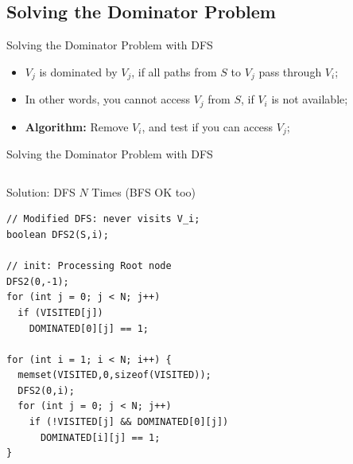 \subsection{Solving the Dominator Problem}

\begin{frame}[fragile]{Solving the Dominator Problem with DFS}
  \begin{exampleblock}{}
    \begin{itemize}
      \item $V_j$ is dominated by $V_j$, if all paths from $S$ to $V_j$ pass through $V_i$;
      \item In other words, you cannot access $V_j$ from $S$, if $V_i$ is not available;
      \item {\bf Algorithm:} Remove $V_i$, and test if you can access $V_j$;
    \end{itemize}
  \end{exampleblock}\bigskip

  
\end{frame}

\begin{frame}[fragile]{Solving the Dominator Problem with DFS}
  \begin{columns}
    

    \begin{exampleblock}{Solution: DFS $N$ Times (BFS OK too)}
{\smaller
\begin{verbatim}
// Modified DFS: never visits V_i;
boolean DFS2(S,i);

// init: Processing Root node
DFS2(0,-1);
for (int j = 0; j < N; j++)
  if (VISITED[j])
    DOMINATED[0][j] == 1;

for (int i = 1; i < N; i++) {
  memset(VISITED,0,sizeof(VISITED));
  DFS2(0,i);
  for (int j = 0; j < N; j++)
    if (!VISITED[j] && DOMINATED[0][j])
      DOMINATED[i][j] == 1;
}
\end{verbatim}}
    \end{exampleblock}
  \end{columns}
\end{frame}



